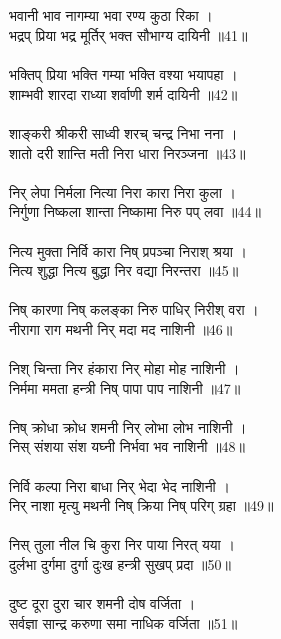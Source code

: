 \subsection{}
भवानी भाव नागम्या भवा रण्य कुठा रिका ।\\
भद्रप् प्रिया भद्र मूर्तिर् भक्त सौभाग्य दायिनी ॥41॥\\
\\
भक्तिप् प्रिया भक्ति गम्या भक्ति वश्या भयापहा ।\\
शाम्भवी शारदा राध्या शर्वाणी शर्म दायिनी ॥42॥\\
\\
शाङ्करी श्रीकरी साध्वी शरच् चन्द्र निभा नना ।\\
शातो दरी शान्ति मती निरा धारा निरञ्जना ॥43॥\\
\\
निर् लेपा निर्मला नित्या निरा कारा निरा कुला ।\\
निर्गुणा निष्कला शान्ता निष्कामा निरु पप् लवा ॥44॥\\
\\
नित्य मुक्ता निर्वि कारा निष् प्रपञ्चा निराश् श्रया ।\\
नित्य शुद्धा नित्य बुद्धा निर वद्या निरन्तरा ॥45॥\\
\\
निष् कारणा निष् कलङ्का निरु पाधिर् निरीश् वरा ।\\
नीरागा राग मथनी निर् मदा मद नाशिनी ॥46॥\\
\\
निश् चिन्ता निर हंकारा निर् मोहा मोह नाशिनी ।\\
निर्ममा ममता हन्त्री निष् पापा पाप नाशिनी ॥47॥\\
\\
निष् क्रोधा  क्रोध शमनी निर् लोभा लोभ नाशिनी ।\\
निस् संशया संश यघ्नी निर्भवा भव नाशिनी ॥48॥\\
\\
निर्वि कल्पा निरा बाधा निर् भेदा भेद नाशिनी ।\\
निर् नाशा मृत्यु मथनी निष् क्रिया निष् परिग् ग्रहा ॥49॥\\
\\
निस् तुला नील चि कुरा निर पाया निरत् यया ।\\
दुर्लभा दुर्गमा दुर्गा दुःख हन्त्री सुखप् प्रदा ॥50॥\\
\\
दुष्ट दूरा दुरा चार शमनी दोष वर्जिता ।\\
सर्वज्ञा सान्द्र करुणा समा नाधिक वर्जिता ॥51॥\\
\\
